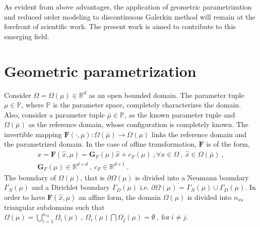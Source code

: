 \documentclass[graybox]{svmult}
\begin{document}
As evident from above advantages, the application of geometric parametrization and reduced order modeling to discontinuous Galerkin method will remain at the forefront of scientific work. The present work is aimed to contribute to this emerging field. 

\section{Geometric parametrization}\label{geometric_parametrization_section}

Consider $\Omega = \Omega(\mu) \in \mathbb{R}^d$ as an open bounded domain. The parameter tuple $\mu \in \mathbb{P}$, where $\mathbb{P}$ is the parameter space, completely characterizes the domain. Also, consider a parameter tuple $\bar{\mu} \in \mathbb{P}$, as the known parameter tuple and $\Omega(\bar{\mu})$ as the reference domain, whose configuration is completely known. The invertible mapping $\bm{F}(\cdot,\mu) : \Omega(\bar{\mu}) \rightarrow \Omega(\mu)$ links the reference domain and the parametrized domain. In the case of affine transformation, $\bm{F}$ is of the form,
\begin{equation}\label{affine_F}
\begin{split}
x = \bm{F}(\hat{x},\mu) = \bm{G}_F(\mu)\hat{x} + c_F(\mu) \ ; \forall x \in \Omega \ , \ \hat{x} \in \Omega(\bar{\mu}) \ , \\ \bm{G}_F(\mu) \in \mathbb{R}^{d \times d} \ , \ c_F \in \mathbb{R}^{d \times 1} \ .
\end{split}
\end{equation}
The boundary of $\Omega(\mu)$, that is $\partial \Omega(\mu)$ is divided into a  Neumann boundary $\Gamma_N(\mu)$ and a Dirichlet boundary $\Gamma_D(\mu)$ i.e. $\partial \Omega(\mu) = \Gamma_N(\mu) \cup \Gamma_D(\mu)$. In order to have $\bm{F}(\hat{x},\mu)$ an affine form, the domain $\Omega(\mu)$ is divided into $n_{su}$ triangular subdomains such that $\Omega(\mu) = \bigcup\limits_{i=1}^{n_{su}} \Omega_i(\mu) \ , \ \Omega_i(\mu) \bigcap \Omega_j(\mu) = \emptyset \ , \ \text{for} \ i \neq j$.
\end{document}
